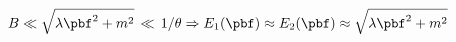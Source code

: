 \begin{equation}
B \ll \sqrt{\lambda\pbf^2 + m^2} \,\ll\, 1/\theta 
\Rightarrow E_1(\pbf) \approx E_2(\pbf) \approx   
\sqrt{\lambda\pbf^2 + m^2}
\end{equation}


